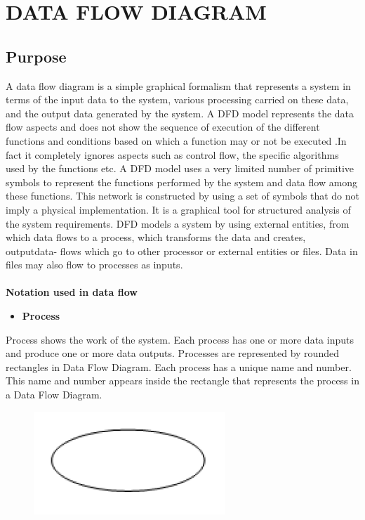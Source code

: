 \documentclass[12pt,a4paper,oneside]{report}
\begin{document}
\section{DATA FLOW DIAGRAM}
\subsection{Purpose}
A data flow diagram is a simple graphical formalism that represents a system in terms
of the input data to the system, various processing carried on these data, and the output data
generated by the system. A DFD model represents the data flow aspects and does not show
the sequence of execution of the different functions and conditions based on which a function
may or not be executed .In fact it completely ignores aspects such as control flow, the specific
algorithms used by the functions etc.
A DFD model uses a very limited number of primitive symbols to represent the functions
performed by the system and data flow among these functions. This network is constructed
by using a set of symbols that do not imply a physical implementation. It is a graphical tool
for structured analysis of the system requirements. DFD models a system by using external
entities, from which data flows to a process, which transforms the data and creates, outputdata-
flows which go to other processor or external entities or files. Data in files may also flow
to processes as inputs.\\
\\
\textbf {Notation used in data flow}
\begin{itemize}
\item\textbf{Process}
\end{itemize}
\par Process shows the work of the system. Each process has one or more data inputs and produce one or more data outputs. Processes are represented by rounded rectangles in
Data Flow Diagram. Each process has a unique name and number. This name and
number appears inside the rectangle that represents the process in a Data Flow Diagram.\\
\begin{figure}[h]
  	\begin{center}
  	
  	
  		\includegraphics[width=3 in,height=1 in]{ellipse.png}
  			\end{center}
  \end{figure}
\end{document}
